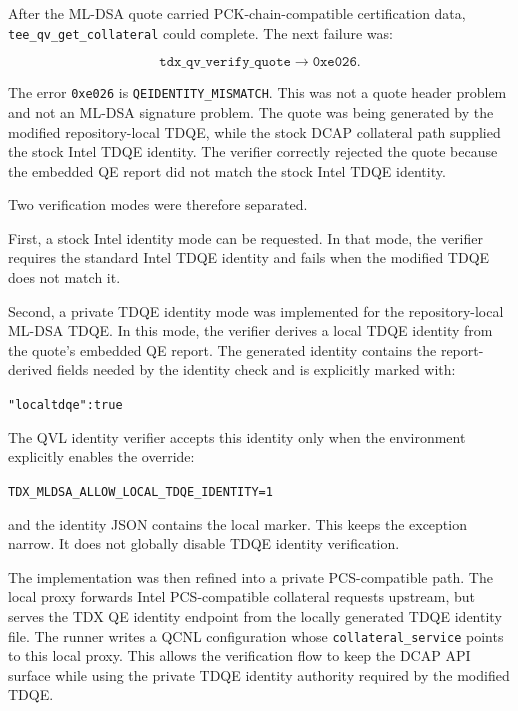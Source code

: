 After the ML-DSA quote carried PCK-chain-compatible certification data,
\texttt{tee\_qv\_get\_collateral} could complete. The next failure was:

\begin{equation}
  \texttt{tdx\_qv\_verify\_quote} \rightarrow \texttt{0xe026}.
\end{equation}

The error \texttt{0xe026} is \texttt{QEIDENTITY\_MISMATCH}. This was not a
quote header problem and not an ML-DSA signature problem. The quote was being
generated by the modified repository-local TDQE, while the stock DCAP
collateral path supplied the stock Intel TDQE identity. The verifier correctly
rejected the quote because the embedded QE report did not match the stock Intel
TDQE identity.

Two verification modes were therefore separated.

First, a stock Intel identity mode can be requested. In that mode, the verifier
requires the standard Intel TDQE identity and fails when the modified TDQE does
not match it.

Second, a private TDQE identity mode was implemented for the repository-local
ML-DSA TDQE. In this mode, the verifier derives a local TDQE identity from the
quote's embedded QE report. The generated identity contains the report-derived
fields needed by the identity check and is explicitly marked with:

\begin{center}
\texttt{"localtdqe":true}
\end{center}

The QVL identity verifier accepts this identity only when the environment
explicitly enables the override:

\begin{center}
\texttt{TDX\_MLDSA\_ALLOW\_LOCAL\_TDQE\_IDENTITY=1}
\end{center}

and the identity JSON contains the local marker. This keeps the exception
narrow. It does not globally disable TDQE identity verification.

The implementation was then refined into a private PCS-compatible path. The
local proxy forwards Intel PCS-compatible collateral requests upstream, but
serves the TDX QE identity endpoint from the locally generated TDQE identity
file. The runner writes a QCNL configuration whose
\texttt{collateral\_service} points to this local proxy. This allows the
verification flow to keep the DCAP API surface while using the private TDQE
identity authority required by the modified TDQE.

